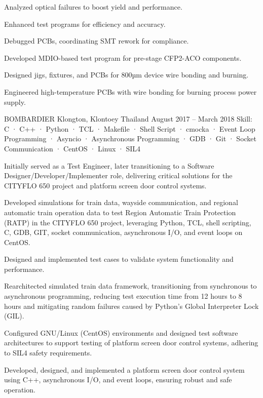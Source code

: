 \begin{cventries}
{\begin{cvitems}
        \item {Analyzed optical failures to boost yield and performance.}
        \item {Enhanced test programs for efficiency and accuracy.}
        \item {Debugged PCBs, coordinating SMT rework for compliance.}
        \item {Developed MDIO-based test program for pre-stage CFP2-ACO components.}
        \item {Designed jigs, fixtures, and PCBs for 800µm device wire bonding and burning.}
        \item {Engineered high-temperature PCBs with wire bonding for burning process power supply.}
      \end{cvitems}
    }

    {BOMBARDIER} %
    {Klongton, Klontoey Thailand} %
    {August 2017 -- March 2018} %
    {Skill: C · C++ · Python · TCL · Makefile · Shell Script · cmocka · Event Loop Programming · Asyncio · Asynchronous Programming · GDB · Git · Socket Communication · CentOS · Linux · SIL4} %
    {
      \begin{cvitems} %
      \item {Initially served as a Test Engineer, later transitioning to a Software Designer/Developer/Implementer role, delivering critical solutions for the CITYFLO 650 project and platform screen door control systems.}
      \item {Developed simulations for train data, wayside communication, and regional automatic train operation data to test Region Automatic Train Protection (RATP) in the CITYFLO 650 project, leveraging Python, TCL, shell scripting, C, GDB, GIT, socket communication, asynchronous I/O, and event loops on CentOS.}
      \item {Designed and implemented test cases to validate system functionality and performance.}
      \item {Rearchitected simulated train data framework, transitioning from synchronous to asynchronous programming, reducing test execution time from 12 hours to 8 hours and mitigating random failures caused by Python’s Global Interpreter Lock (GIL).}
      \item {Configured GNU/Linux (CentOS) environments and designed test software architectures to support testing of platform screen door control systems, adhering to SIL4 safety requirements.}
      \item {Developed, designed, and implemented a platform screen door control system using C++, asynchronous I/O, and event loops, ensuring robust and safe operation.}
      \end{cvitems}
    }


\end{cventries}
